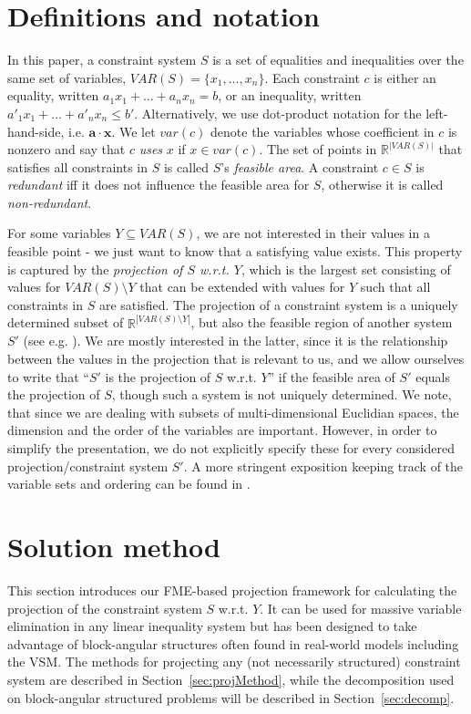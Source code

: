\documentclass{llncs}
\newcommand{\var}{\mathit{var}}
\newcommand{\VAR}{\mathit{VAR}}
\newcommand{\ve}{\mathbf}
\begin{document}
\section{Definitions and notation} \label{sec:notation}
In this paper, a constraint system $S$ is a set of equalities and inequalities over the same set of variables, $\VAR(S)=\{x_1,\ldots, x_n\}$. Each constraint $c$ is either an equality, written $a_1x_1 + \ldots +a_nx_n = b$, or an inequality, written $a'_1x_1 + \ldots +a'_nx_n\leq b'$. Alternatively, we use dot-product notation for the left-hand-side, i.e. $\ve{a}\cdot \ve{x}$. 
We let $\var(c)$ denote the variables whose coefficient in $c$ is nonzero and say that $c$ \emph{uses} $x$ if $x\in \var(c)$. 
The set of points in $\mathbb{R}^{|\VAR(S)|}$ that satisfies all constraints in $S$ is called $S$'s \emph{feasible area}. A constraint $c\in S$ is \emph{redundant} iff it does not influence the feasible area for $S$, otherwise it is called \emph{non-redundant}.  

For some variables $Y\subseteq \VAR(S)$, we are not interested in their values in a feasible point - we just want to know that a satisfying value exists. This property is captured by the \emph{projection of $S$ w.r.t. $Y$}, which is the largest set consisting of values for $\VAR(S)\setminus Y$ that can be extended with values for $Y$ such that all constraints in $S$ are satisfied. 
%
The projection of a constraint system is a uniquely determined subset of $\mathbb{R}^{|\VAR(S)\setminus Y|}$, but also the feasible region of another system $S'$ (see e.g. \cite{ziegler95}). We are mostly interested in the latter, since it is the relationship between the values in the projection that is relevant to us, and we allow ourselves to write that ``$S'$ is the projection of $S$ w.r.t. $Y$'' if the feasible area of $S'$ equals the projection of $S$, though such a system is not uniquely determined.
We note, that since we are dealing with subsets of multi-dimensional Euclidian spaces, the dimension and the order of the variables are important. However, in order to simplify the presentation, we do not explicitly specify these for every considered projection/constraint system $S'$. A more stringent exposition keeping track of the variable sets and ordering can be found in \cite{MyTechRep}.
\section{Solution method} \label{sec:method}
This section introduces our FME-based projection framework for calculating the projection of the constraint system $S$ w.r.t. $Y$. It can be used for massive variable elimination in any linear inequality system but has been designed to take advantage of block-angular structures often found in real-world models including the VSM. 
The methods for projecting any (not necessarily structured) constraint system are described in Section~\ref{sec:projMethod}, while the decomposition used on block-angular structured problems will be described in Section~\ref{sec:decomp}.
\end{document}
